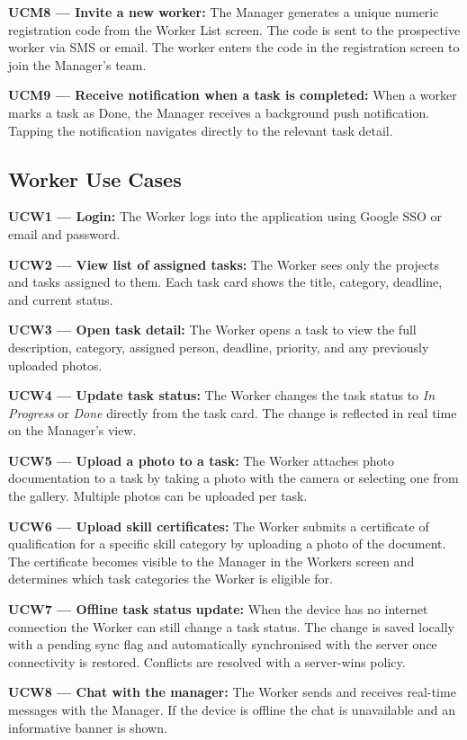 \documentclass[12pt,a4paper]{article}
\begin{document}
\textbf{UCM8 --- Invite a new worker:} The Manager generates a unique numeric registration code from the Worker List screen. The code is sent to the prospective worker via SMS or email. The worker enters the code in the registration screen to join the Manager's team.

\textbf{UCM9 --- Receive notification when a task is completed:} When a worker marks a task as Done, the Manager receives a background push notification. Tapping the notification navigates directly to the relevant task detail.

\subsection{Worker Use Cases}

\textbf{UCW1 --- Login:} The Worker logs into the application using Google SSO or email and password.

\textbf{UCW2 --- View list of assigned tasks:} The Worker sees only the projects and tasks assigned to them. Each task card shows the title, category, deadline, and current status.

\textbf{UCW3 --- Open task detail:} The Worker opens a task to view the full description, category, assigned person, deadline, priority, and any previously uploaded photos.

\textbf{UCW4 --- Update task status:} The Worker changes the task status to \textit{In Progress} or \textit{Done} directly from the task card. The change is reflected in real time on the Manager's view.

\textbf{UCW5 --- Upload a photo to a task:} The Worker attaches photo documentation to a task by taking a photo with the camera or selecting one from the gallery. Multiple photos can be uploaded per task.

\textbf{UCW6 --- Upload skill certificates:} The Worker submits a certificate of qualification for a specific skill category by uploading a photo of the document. The certificate becomes visible to the Manager in the Workers screen and determines which task categories the Worker is eligible for.

\textbf{UCW7 --- Offline task status update:} When the device has no internet connection the Worker can still change a task status. The change is saved locally with a pending sync flag and automatically synchronised with the server once connectivity is restored. Conflicts are resolved with a server-wins policy.

\textbf{UCW8 --- Chat with the manager:} The Worker sends and receives real-time messages with the Manager. If the device is offline the chat is unavailable and an informative banner is shown.
\end{document}
